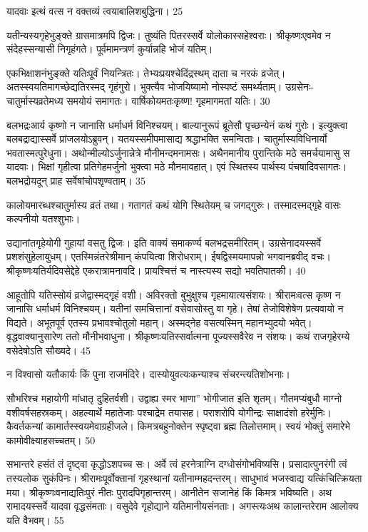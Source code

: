 यादवाः
इत्थं वत्स न वक्तव्यं त्वयाबालिशबुद्धिना।
25

यतीन्यस्यगृहेभुङ्क्ते ग्रासमात्रमपि द्विजः।
तुष्यंति पितरस्सर्वे योलोकास्सहेश्वराः।
श्रीकृष्णःएवमेव न संदेहस्सन्यासी निगृहंगते।
पूर्वमामन्त्रणं कुर्यान्नहि भोजं यतिम्।

एकभिक्षाशनंभुङ्क्ते यतिःपूर्वं नियन्त्रितः।
तेभ्यःप्रयश्चेदिंद्रस्थम् दाता च नरकं व्रजेत्।
अतस्स्वयतिमागच्छेद्यतिरस्मद् गृहंगुरो।
भुक्त्यैव भोजयिष्यामो नोस्पष्टं समर्थ्यताम्।
उग्रसेनः- चातुर्मास्यव्रतेमध्य समयोयं समागतः।
वार्षिकोयमतःकृष्ण! गृहमागमतां यतिः।
30

बलभद्रःआर्य कृष्णो न जानासि धर्माधर्म विनिश्चयम्।
बाल्यानुरूपं ब्रूतेसौ पृच्छन्येनं कथं गुरोः।
इत्युक्त्वा बलबद्राद्यास्सर्वे प्रांजलयोऽब्रुवन्।
यतयस्समीपमासाद्य श्रद्धाभक्ति समन्विताः।
चातुर्मास्यविधिनार्यो भवतास्मत्पुरेधुना।
अथोन्मील्योऽर्जुनान्नेत्रे मौनीमन्दमनामसः।
अथैनमानीय पुरान्तिके मठे समर्चयामासु स यादवाः।
भिक्षां गृहीत्वा प्रतिगेहमर्जुनो भुक्त्वा मठे मौनमावहात्।
एवं स्थितस्य पार्थस्य पंचषादिवसागतः।
बलभद्रोयदून् प्राह सर्वेषांचोपशृण्वताम्।
35

कालोयमारब्धश्चातुर्मास्य व्रतं तथा।
गतागतं कथं योगि स्थितेयम् च जगद्गुरुः।
तस्मादस्मद्गृहे वासः कल्पनीयो यतश्शुभाः।

उद्यानांतगृहेयोगी गुहायां वसतु द्विजः।
इति वाक्यं समाकर्ण्य बलभद्रसमीरितम्।
उग्रसेनादयस्सर्वे प्रशशंसुहेलायुधम्।
एतस्मिन्नंतरेश्रीमान् कंपयित्वा शिरोधराम्।
ईषद्विस्मयमापन्नो भगवानब्रवीद् वचः।
श्रीकृष्णःयतिर्यदिवसेद्देहे एकरात्रामनावदि।
प्रायश्चित्तं च नास्त्यस्य सद्यो भवतिपातकी।
40

आहूतोपि यतिस्सोयं व्रजेद्वास्मद्गृहं वशी।
अविरक्तो बुभुक्षुश्च गृहमायात्यसंशयः।
श्रीरामःवत्स कृष्ण न जानासि धर्माधर्म विनिश्चयम्।
यतीनां समचित्तानां वसेवासोस्तु वा गृहे।
तेषां तेजोविशेषेण प्रत्यवायो न विद्यते।
अभूतपूर्व एतस्य प्रभावश्चोतुलो महान्।
अस्मद्नेह वसत्यस्मिन् महानभ्युदयो भवेत्।
वृद्धवाक्यानुसारेण ततो मौनीभवाधुना।
श्रीकृष्णःयतिस्सर्वात्मना पूज्यस्सवैरेव न संशयः।
कथं राजगृहेरम्ये वसेदेषोऽति सौख्यदे।
45

न विश्वासो यतौकार्यः किं पुना राजमंदिरे।
दास्योयुवत्यःकन्याश्च संचरन्त्यतिशोभनाः।

सौभरिश्च महायोगी मांधातृ दुहितर्वशी।
उद्वाह्य स्मर भाणा” भोगीजात इति शृतम्।
गौतमप्यंबुधौ माग्नो वशीवर्षसहस्रकम्।
अहल्यार्थे महातेजाः पश्चाद्रेम तयासह।
पराशरोपि योगीन्द्रः साक्षादंशो हरेर्मुनिः।
कैवर्तकन्यां कामार्तस्स्वयमेवाग्रहीजले।
किमत्रबहुनोक्तेन स्पृष्ट्वा ब्रह्म तिलोत्तमाम्।
स्वयं भोक्तुं समारेभे कामोवीक्ष्याहसच्चतम्।
50

सभान्तरे हसंतं तं दृष्ट्वा कृद्धोऽशपच्च सः।
अर्वे त्वं हरनेत्राग्नि दग्धोसंगोभविष्यसि।
प्रसादात्पुनरंगी त्वं तस्यलोक सुकंपिनः।
श्रीरामःपूर्वोक्तानां गृहस्थानां यतीनाम्महदन्तरम्।
साधुभावं भजस्वाद्य यत्किंचित्क्रियता मया।
श्रीकृष्णःवनाद्यतिःपुरं नीतः पुरादपिगृहान्तरम्।
आनीतेन सजानेहं किं किमत्र भविष्यति।
अथ रामादयस्सर्वे यादवा वृद्धसंमताः।
वसुदेवे गृहोद्याने यतिमानीयसंनताः।
अगस्त्यःअथ कालान्तरेराम आलोक्य यति वैभवम्।
55

